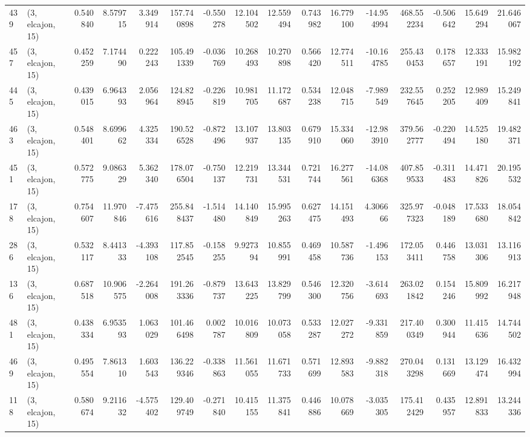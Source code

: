 \begin{tabular}{llrrrrrrrrrrrrrr}
439 &  (3, elcajon, 15) &   0.540840 &   8.579715 &   3.349914 &   157.740898 &  -0.550278 &  12.104502 &  12.559494 &  0.743982 &  16.779100 & -14.954994 &   468.552234 & -0.506642 &  15.649294 &  21.646067 \\
457 &  (3, elcajon, 15) &   0.452259 &   7.174490 &   0.222243 &   105.491339 &  -0.036769 &  10.268493 &  10.270898 &  0.566420 &  12.774511 & -10.164785 &   255.430453 &  0.178657 &  12.333191 &  15.982192 \\
445 &  (3, elcajon, 15) &   0.439015 &   6.964393 &   2.056964 &   124.828945 &  -0.226819 &  10.981705 &  11.172687 &  0.534238 &  12.048715 &  -7.989549 &   232.557645 &  0.252205 &  12.989409 &  15.249841 \\
463 &  (3, elcajon, 15) &   0.548401 &   8.699662 &   4.325334 &   190.526528 &  -0.872496 &  13.107937 &  13.803135 &  0.679910 &  15.334060 & -12.983910 &   379.562777 & -0.220494 &  14.525180 &  19.482371 \\
451 &  (3, elcajon, 15) &   0.572775 &   9.086329 &   5.362340 &   178.076504 &  -0.750137 &  12.219731 &  13.344531 &  0.721744 &  16.277561 & -14.086368 &   407.859533 & -0.311483 &  14.471826 &  20.195532 \\
178 &  (3, elcajon, 15) &   0.754607 &  11.970846 &  -7.475616 &   255.848437 &  -1.514480 &  14.140849 &  15.995263 &  0.627475 &  14.151493 &   4.306666 &   325.977323 & -0.048189 &  17.533680 &  18.054842 \\
286 &  (3, elcajon, 15) &   0.532117 &   8.441333 &  -4.393108 &   117.852545 &  -0.158255 &   9.927394 &  10.855991 &  0.469458 &  10.587736 &  -1.496153 &   172.053411 &  0.446758 &  13.031306 &  13.116913 \\
136 &  (3, elcajon, 15) &   0.687518 &  10.906575 &  -2.264008 &   191.263336 &  -0.879737 &  13.643225 &  13.829799 &  0.546300 &  12.320756 &  -3.614693 &   263.021842 &  0.154246 &  15.809992 &  16.217948 \\
481 &  (3, elcajon, 15) &   0.438334 &   6.953593 &   1.063029 &   101.466498 &   0.002787 &  10.016809 &  10.073058 &  0.533287 &  12.027272 &  -9.331859 &   217.400349 &  0.300944 &  11.415636 &  14.744502 \\
469 &  (3, elcajon, 15) &   0.495554 &   7.861310 &   1.603543 &   136.229346 &  -0.338863 &  11.561055 &  11.671733 &  0.571699 &  12.893583 &  -9.882318 &   270.043298 &  0.131669 &  13.129474 &  16.432994 \\
118 &  (3, elcajon, 15) &   0.580674 &   9.211632 &  -4.575402 &   129.409749 &  -0.271840 &  10.415155 &  11.375841 &  0.446886 &  10.078669 &  -3.035305 &   175.412429 &  0.435957 &  12.891833 &  13.244336 \\

\end{tabular}

